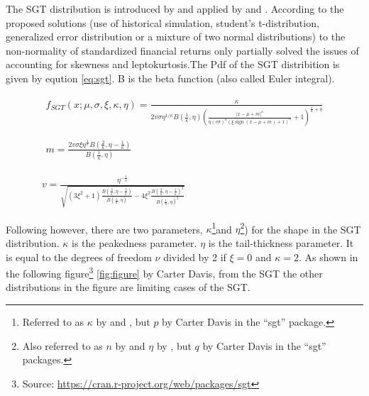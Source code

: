 \documentclass[a4paper, twoside]{templates/ociamthesis}
\begin{document}
\noindent The SGT distribution is introduced by \textcite{theodossiou1998} and applied by \textcite{bali2007} and \textcite{bali2008}. According to \textcite{bali2008} the proposed solutions (use of historical simulation, student's t-distribution, generalized error distribution or a mixture of two normal distributions) to the non-normality of standardized financial returns only partially solved the issues of accounting for skewness and leptokurtosis.The Pdf of the SGT distribition is given by eqution \eqref{eq:sgt}. B is the beta function (also called Euler integral).

\begin{equation}
\begin{array}{c}
\begin{array}{c}
f_{S G T}(x ; \mu, \sigma, \xi, \kappa, \eta)=\frac{\kappa}{2 v \sigma \eta^{1 / \kappa} B\left(\frac{1}{\kappa}, \eta\right)\left(\frac{|x-\mu +m|^{\kappa}}{\eta(v \sigma)^{\kappa}(\xi \operatorname{sign}(x-\mu + m)+1)^{\kappa}}+1\right)^{\frac{1}{\kappa}+\eta}} \\ \\ \\ 

m=\frac{2 v \sigma \xi \eta^{\frac{1}{\kappa}} B\left(\frac{2}{\kappa}, \eta-\frac{1}{\kappa}\right)}{B\left(\frac{1}{\kappa}, \eta\right)}
\end{array}
\\ \\ \\ 
v=\frac{\eta^{-\frac{1}{\kappa}}}{\sqrt{\left(3 \xi^{2}+1\right) \frac{B\left(\frac{3}{\kappa}, \eta-\frac{2}{\kappa}\right)}{B\left(\frac{1}{\kappa}, \eta\right)}-4 \xi^{2} \frac{B\left(\frac{2}{\kappa}, \eta-\frac{1}{\kappa}\right)^{2}}{B\left(\frac{1}{\kappa}, \eta\right)^{2}}}}
\end{array}
\label{eq:sgt}
\end{equation}

\noindent Following \textcite{theodossiou1998} however, there are two parameters, \(\kappa\)\footnote{Referred to as \(\kappa\) by \textcite{theodossiou1998} and \textcite{bali2008}, but \(p\) by Carter Davis in the ``sgt'' package.}and \(\eta\)\footnote{Also referred to as \(n\) by \textcite{theodossiou1998} and \(\eta\) by \textcite{bali2008}, but \(q\) by Carter Davis in the ``sgt'' packages.}) for the shape in the SGT distribution. \(\kappa\) is the peakedness parameter. \(\eta\) is the tail-thickness parameter. It is equal to the degrees of freedom \(\nu\) divided by 2 if \(\xi = 0\) and \(\kappa = 2\). As shown in the following figure\footnote{Source: \href{https://cran.r-project.org/web/packages/sgt\%22}{https://cran.r-project.org/web/packages/sgt}} \ref{fig:figure} by Carter Davis, from the SGT the other distributions in the figure are limiting cases of the SGT.
\end{document}
